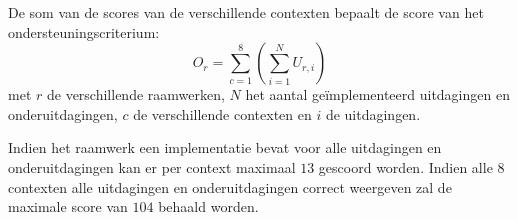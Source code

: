  \begin{table}[H]
 \centering
 \caption{Beschikbare apparaten met hun besturingssysteem~(BS) en browser.}
 \label{tabel:toestellen-hci}
 \end{table}


De som van de scores van de verschillende contexten bepaalt de score van het ondersteuningscriterium:
\begin{equation}
  O_r = \sum_{c=1}^{8}{\left(\sum_{i=1}^{N}U_{r,i}\right)}
  \label{eq:ondersteuning}
\end{equation}
met $r$ de verschillende raamwerken,  $N$ het aantal geïmplementeerd uitdagingen en onderuitdagingen,  $c$ de verschillende contexten en $i$ de uitdagingen. 


Indien het raamwerk een implementatie bevat voor alle uitdagingen en onderuitdagingen kan er per context maximaal $13$ gescoord worden.
Indien alle $8$ contexten alle uitdagingen en onderuitdagingen correct weergeven zal de maximale score van $104$ behaald worden.

% 

